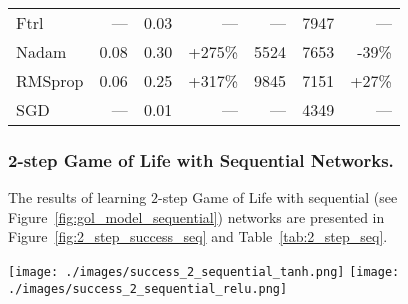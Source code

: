 \documentclass[letterpaper]{article} %
\begin{document}
\begin{table*}[t]
\begin{tabular}{lrrrrrr}
        \\
        Ftrl & --- & 0.03 & --- & --- & 7947 & ---
        \\
        Nadam & 0.08 & 0.30 & +275\% & 5524 & 7653 & -39\%
        \\
        RMSprop & 0.06 & 0.25 & +317\% & 9845 & 7151 & +27\%
        \\
        SGD & --- & 0.01 & --- & --- & 4349 & ---
        \\\bottomrule
    \end{tabular}
    \caption{Results on 2-step Game of Life with recursive network and Tanh (left) / ReLU (right) activations.}
    \label{tab:2_step_rec}
\end{table*}


\subsubsection{2-step Game of Life with Sequential Networks.}
The results of learning $2$-step Game of Life with sequential (see Figure~\ref{fig:gol_model_sequential}) networks are presented in Figure~\ref{fig:2_step_success_seq} and Table~\ref{tab:2_step_seq}.

\begin{figure*}[t!]
    \centering
    \texttt{[image: ./images/success\_2\_sequential\_tanh.png]}
    \texttt{[image: ./images/success\_2\_sequential\_relu.png]}
    \caption{Success rates on 2-step Game of Life with sequential networks with Tanh (left) / ReLU (right) activations.}
    \label{fig:2_step_success_seq}
\end{figure*}
\end{document}
